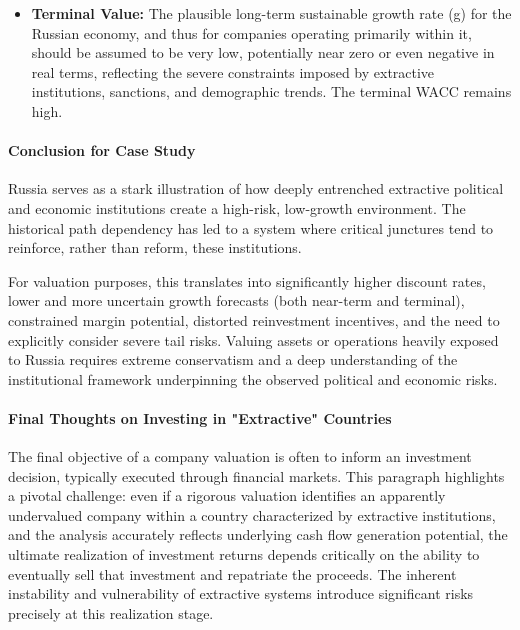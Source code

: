 \begin{itemize}
\begin{itemize}
              \item \textit{Beta:} Earnings volatility is likely high due to dependence on volatile commodity prices and susceptibility to geopolitical shocks, potentially justifying a higher Beta, though data limitations and structural breaks make estimation difficult.
          \end{itemize}
    \item \textbf{Terminal Value:} The plausible long-term sustainable growth rate (g) for the Russian economy, and thus for companies operating primarily within it, should be assumed to be very low, potentially near zero or even negative in real terms, reflecting the severe constraints imposed by extractive institutions, sanctions, and demographic trends. The terminal WACC remains high.
\end{itemize}

\paragraph{Conclusion for Case Study}
Russia serves as a stark illustration of how deeply entrenched extractive political and economic institutions create a high-risk, low-growth environment. The historical path dependency has led to a system where critical junctures tend to reinforce, rather than reform, these institutions. 

For valuation purposes, this translates into significantly higher discount rates, lower and more uncertain growth forecasts (both near-term and terminal), constrained margin potential, distorted reinvestment incentives, and the need to explicitly consider severe tail risks. Valuing assets or operations heavily exposed to Russia requires extreme conservatism and a deep understanding of the institutional framework underpinning the observed political and economic risks.

\paragraph{Final Thoughts on Investing in "Extractive" Countries}
The final objective of a company valuation is often to inform an investment decision, typically executed through financial markets. This paragraph highlights a pivotal challenge: even if a rigorous valuation identifies an apparently undervalued company within a country characterized by extractive institutions, and the analysis accurately reflects underlying cash flow generation potential, the ultimate realization of investment returns depends critically on the ability to eventually sell that investment and repatriate the proceeds. The inherent instability and vulnerability of extractive systems introduce significant risks precisely at this realization stage.


